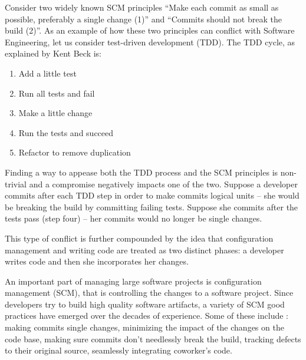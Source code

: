 \documentclass[conference]{IEEEtran}
\newcommand{\purpose}[1]{\textsc{\textbf{#1}}}
\begin{document}
Consider two widely known SCM principles ``Make each commit as small as possible, preferably a single change (1)'' and 
``Commits should not break the build (2)''.
As an example of how these two principles can conflict with Software Engineering,
let us consider test-driven development (TDD).
The TDD cycle, as explained by Kent Beck \cite{beck2003tdd} is:
\begin{enumerate}
\item Add a little test
\item Run all tests and fail
\item Make a little change
\item Run the tests and succeed
\item Refactor to remove duplication
\end{enumerate}
Finding a way to appease both the TDD process and the SCM principles is non-trivial and a compromise negatively impacts one of the two.  
Suppose a developer commits after each TDD step in order to make commits logical units -- she would be breaking the build by committing failing tests.  
Suppose she commits after the tests pass (step four) -- her commits would no longer be single changes.

This type of conflict is further compounded by the idea that configuration management and writing code are treated as two distinct phases: a developer writes code and then she incorporates her changes.








An important part of managing large software projects is configuration management (SCM), that is controlling the changes to a software project.
Since developers try to build high quality software artifacts, a variety of SCM good practices have
emerged over the decades of experience.  
Some of these include : making commits single changes, minimizing the impact of the changes on the code base, making sure commits don't needlessly break the build, tracking defects to their original source, seamlessly integrating coworker's code.
\end{document}
